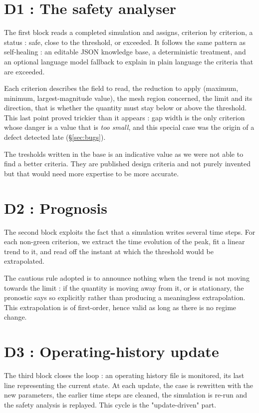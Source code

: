 \section{D1 : The safety analyser}

The first block reads a completed simulation and assigns, criterion by
criterion, a status : safe, close to the threshold, or exceeded. It follows
the same pattern as self-healing : an editable JSON knowledge base, a
deterministic treatment, and an optional language model fallback to explain in
plain language the criteria that are exceeded.

Each criterion describes the field to read, the reduction to apply (maximum,
minimum, largest-magnitude value), the mesh region concerned, the limit and its
direction, that is whether the quantity must stay below or above the threshold.
This last point
proved trickier than it appears : gap width is the only criterion whose danger is
a value that is \textit{too small}, and this special case was the origin of a
defect detected late (§\ref{sec:bugs}).

The tresholds written in the base is an indicative value as we were not able to find
a better criteria. They are published design criteria and not purely invented but
that would need more expertise to be more accurate.


\section{D2 : Prognosis}

The second block exploits the fact that a simulation writes several time steps.
For each non-green criterion, we extract the time evolution of the peak, fit a
linear trend to it, and read off the instant at which the threshold would be
extrapolated.

The cautious rule adopted is to announce nothing when the trend is not moving
towards the limit : if the quantity is moving away from it, or is stationary, the
pronostic says so explicitly rather than producing a meaningless extrapolation.
This extrapolation is of first-order, hence valid as long as there is no regime change.

\section{D3 : Operating-history update}

The third block closes the loop : an operating history file is monitored, its
last line representing the current state. At each update, the case is rewritten
with the new parameters, the earlier time steps are cleaned, the simulation is
re-run and the safety analysis is replayed. This cycle is the "update-driven" part.

